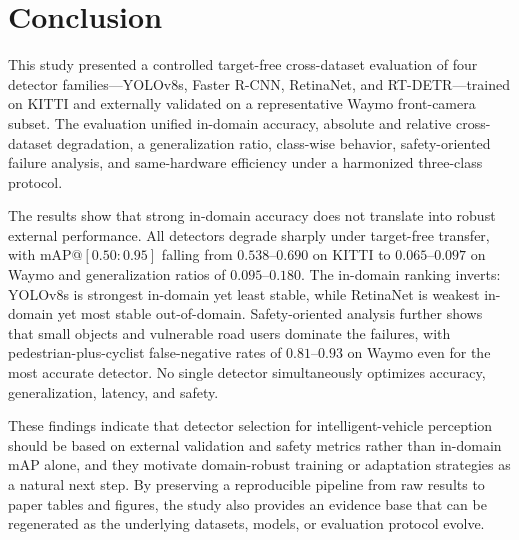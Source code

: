 \section{Conclusion}
\label{sec:conclusion}

This study presented a controlled target-free cross-dataset evaluation of four detector
families---YOLOv8s, Faster R-CNN, RetinaNet, and RT-DETR---trained on KITTI and externally
validated on a representative Waymo front-camera subset. The evaluation unified in-domain
accuracy, absolute and relative cross-dataset degradation, a generalization ratio,
class-wise behavior, safety-oriented failure analysis, and same-hardware efficiency under a
harmonized three-class protocol.

The results show that strong in-domain accuracy does not translate into robust external
performance. All detectors degrade sharply under target-free transfer, with
mAP@$[0.50{:}0.95]$ falling from $0.538$--$0.690$ on KITTI to $0.065$--$0.097$ on Waymo
and generalization ratios of $0.095$--$0.180$. The in-domain ranking inverts: YOLOv8s is
strongest in-domain yet least stable, while RetinaNet is weakest in-domain yet most stable
out-of-domain. Safety-oriented analysis further shows that small objects and vulnerable
road users dominate the failures, with pedestrian-plus-cyclist false-negative rates of
$0.81$--$0.93$ on Waymo even for the most accurate detector. No single detector
simultaneously optimizes accuracy, generalization, latency, and safety.

These findings indicate that detector selection for intelligent-vehicle perception should
be based on external validation and safety metrics rather than in-domain mAP alone, and
they motivate domain-robust training or adaptation strategies as a natural next step. By
preserving a reproducible pipeline from raw results to paper tables and figures, the study
also provides an evidence base that can be regenerated as the underlying datasets, models,
or evaluation protocol evolve.
